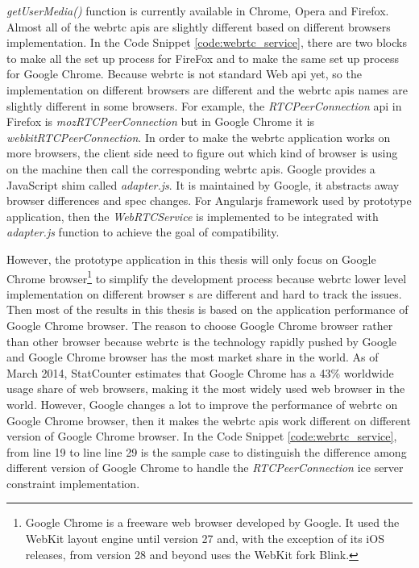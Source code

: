 \par \textit{getUserMedia()} function is currently available in Chrome, Opera and Firefox. Almost all of the \gls{webrtc} \gls{api}s are slightly different based on different browsers implementation. In the Code Snippet \ref{code:webrtc_service}, there are two blocks to make all the set up process for FireFox and to make the same set up process for Google Chrome. Because \gls{webrtc} is not standard Web \gls{api} yet, so the implementation on different browsers are different and the \gls{webrtc} \gls{api}s names are slightly different in some browsers. For example, the \textit{RTCPeerConnection} \gls{api} in Firefox is \textit{mozRTCPeerConnection} but in Google Chrome it is \textit{webkitRTCPeerConnection}. In order to make the \gls{webrtc} application works on more browsers, the client side need to figure out which kind of browser is using on the machine then call the corresponding \gls{webrtc} \gls{api}s. Google provides a JavaScript shim called \textit{adapter.js}. It is maintained by Google, it abstracts away browser differences and spec changes. For Angularjs framework used by prototype application, then the \textit{WebRTCService} is implemented to be integrated with \textit{adapter.js} function to achieve the goal of compatibility.

\par However, the prototype application in this thesis will only focus on Google Chrome browser\footnote{Google Chrome is a freeware web browser developed by Google. It used the WebKit layout engine until version 27 and, with the exception of its iOS releases, from version 28 and beyond uses the WebKit fork Blink.\cite{wiki:google_chrome}} to simplify the development process because \gls{webrtc} lower level implementation on different browser s are different and hard to track the issues. Then most of the results in this thesis is based on the application performance of Google Chrome browser. The reason to choose Google Chrome browser rather than other browser because \gls{webrtc} is the technology rapidly pushed by Google and Google Chrome browser has the most market share in the world. As of March 2014, StatCounter estimates that Google Chrome has a 43\% worldwide usage share of web browsers, making it the most widely used web browser in the world.\cite{wiki:google_chrome} However, Google changes a lot to improve the performance of \gls{webrtc} on Google Chrome browser, then it makes the \gls{webrtc} \gls{api}s work different on different version of Google Chrome browser. In the Code Snippet \ref{code:webrtc_service}, from line 19 to line line 29 is the sample case to distinguish the difference among different version of Google Chrome to handle the \textit{RTCPeerConnection} \gls{ice} server constraint implementation.

